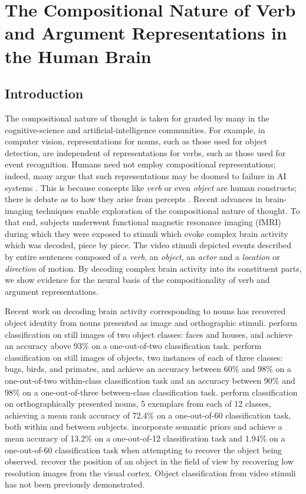 \chapter{The Compositional Nature of Verb and Argument Representations in the
  Human Brain}

\section{Introduction}
\label{sec:introduction}

The compositional nature of thought is taken for granted by many in the
cognitive-science and artificial-intelligence communities.
%
For example, in computer vision, representations for nouns, such as those
used for object detection, are independent of representations for verbs, such
as those used for event recognition.
%
Humans need not employ compositional representations; indeed, many argue that
such representations may be doomed to failure in AI systems
\citep{brooks1991intelligence}.
%
This is because concepts like \emph{verb} or even \emph{object} are human
constructs; there is debate as to how they arise from percepts
\citep{smith1996origin}.
%
Recent advances in brain-imaging techniques enable exploration of the
compositional nature of thought.
%
To that end, subjects underwent functional magnetic resonance imaging (fMRI)
during which they were exposed to stimuli which evoke complex brain activity
which was decoded, piece by piece.
%
The video stimuli depicted events described by entire sentences composed of a
\emph{verb}, an \emph{object}, an \emph{actor} and a \emph{location} or
\emph{direction} of motion.
%
By decoding complex brain activity into its constituent parts, we show evidence
for the neural basis of the compositionality of verb and argument
representations.

Recent work on decoding brain activity corresponding to nouns has
recovered object identity from nouns presented as image and orthographic
stimuli.
%
\citet{hanson2009} perform classification on still images of two object
classes: faces and houses, and achieve an accuracy above 93\% on a
one-out-of-two classification task.
%
\citet{connolly2012} perform classification on still images of objects, two
instances of each of three classes: bugs, birds, and primates, and achieve an
accuracy between 60\% and 98\% on a one-out-of-two within-class classification
task and an accuracy between 90\% and 98\% on a one-out-of-three between-class
classification task.
%
\citet{just2010} perform classification on orthographically presented nouns, 5
exemplars from each of 12 classes, achieving a mean rank accuracy of 72.4\% on
a one-out-of-60 classification task, both within and between subjects.
%
\citet{pereira2012} incorporate semantic priors and achieve a mean accuracy
of 13.2\% on a one-out-of-12 classification task and 1.94\% on a one-out-of-60
classification task when attempting to recover the object being observed.
%
\citet{miyawaki2008} recover the position of an object in the field of view by
recovering low resolution images from the visual cortex.
%
Object classification from video stimuli has not been previously demonstrated.

